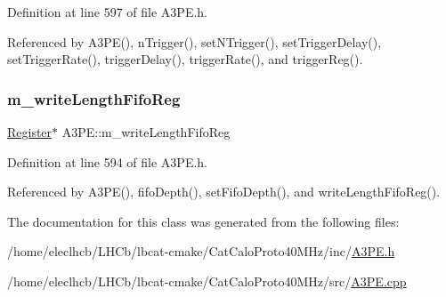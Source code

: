 Definition at line 597 of file A3\+P\+E.\+h.



Referenced by A3\+P\+E(), n\+Trigger(), set\+N\+Trigger(), set\+Trigger\+Delay(), set\+Trigger\+Rate(), trigger\+Delay(), trigger\+Rate(), and trigger\+Reg().

\mbox{\label{classA3PE_a9a0cb2253ea34c0be567a03684217fee}} 
\subsubsection{\texorpdfstring{m\+\_\+write\+Length\+Fifo\+Reg}{m\_writeLengthFifoReg}}
{\footnotesize\ttfamily \hyperlink{classRegister}{Register}$\ast$ A3\+P\+E\+::m\+\_\+write\+Length\+Fifo\+Reg\hspace{0.3cm}{\ttfamily [private]}}



Definition at line 594 of file A3\+P\+E.\+h.



Referenced by A3\+P\+E(), fifo\+Depth(), set\+Fifo\+Depth(), and write\+Length\+Fifo\+Reg().



The documentation for this class was generated from the following files\+:\begin{DoxyCompactItemize}
\item 
/home/eleclhcb/\+L\+H\+Cb/lbcat-\/cmake/\+Cat\+Calo\+Proto40\+M\+Hz/inc/\hyperlink{A3PE_8h}{A3\+P\+E.\+h}\item 
/home/eleclhcb/\+L\+H\+Cb/lbcat-\/cmake/\+Cat\+Calo\+Proto40\+M\+Hz/src/\hyperlink{A3PE_8cpp}{A3\+P\+E.\+cpp}\end{DoxyCompactItemize}
